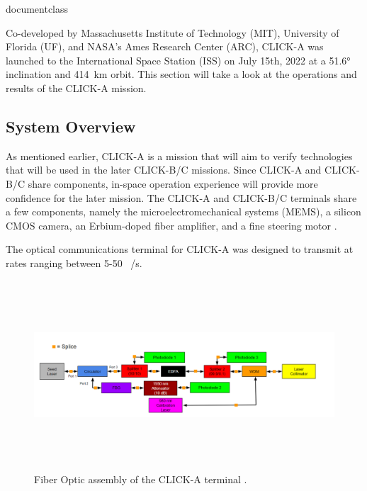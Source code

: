 \csname documentclass
\usepackage[utf8x]{inputenc}
\usepackage{blindtext}
\usepackage{float}
\usepackage{graphicx}
\usepackage{siunitx}
\usepackage{cite}
\usepackage{hyperref}
\usepackage{cleveref}




Co-developed by Massachusetts Institute of Technology (MIT), University of Florida (UF), and NASA's Ames Research Center (ARC), CLICK-A was launched to the International Space Station (ISS) on July 15th, 2022 at a \ang{51.6} inclination and \qty{414}{\kilo\meter} orbit. This section will take a look at the operations and results of the CLICK-A mission.

\subsection{System Overview}
As mentioned earlier, CLICK-A is a mission that will aim to verify technologies that will be used in the later CLICK-B/C missions. Since CLICK-A and CLICK-B/C share components, in-space operation experience will provide more confidence for the later mission.
The CLICK-A and CLICK-B/C terminals share a few components, namely the microelectromechanical systems (MEMS), a silicon CMOS camera, an Erbium-doped fiber amplifier, and a fine steering motor \cite{click_a}.

The optical communications terminal for CLICK-A was designed to transmit at rates ranging between 5-50 \unit[per-mode = symbol,per-symbol = p]{\mega\bit\per\second}.

\begin{figure}[t]
    \centering
    \includegraphics[width=\textwidth, height=200pt]{images/click_a_fiber_comp.PNG}
    \caption{Fiber Optic assembly of the CLICK-A terminal \cite{click_a}.}
    \label{fig:fiber_optic}
\end{figure}

